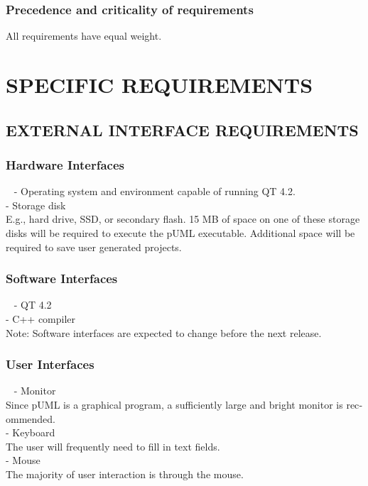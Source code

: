 \documentclass[twoside,letterpaper]{article}
\begin{document}
\subsubsection[Precedence and criticality of requirements]{\rmfamily\bfseries
Precedence and criticality of requirements}
{
All requirements have equal weight.}












\clearpage\section[SPECIFIC REQUIREMENTS]{\rmfamily\bfseries
SPECIFIC REQUIREMENTS}

\subsection[EXTERNAL INTERFACE REQUIREMENTS]{\rmfamily\bfseries
EXTERNAL INTERFACE REQUIREMENTS}

\subsubsection[Hardware Interfaces]{\rmfamily\bfseries
Hardware Interfaces}
{
\foreignlanguage{english}{\ }\foreignlanguage{english}
{
- Operating system and environment capable of running QT 4.2.
\\- Storage disk
\\  E.g., hard drive, SSD, or secondary flash. 15 MB of space on one of these storage disks will be required
to execute the pUML executable. Additional space will be required to save user generated projects.}}

\subsubsection[Software Interfaces]{\rmfamily\bfseries
Software Interfaces}
{ \foreignlanguage{english}{\ }\foreignlanguage{english}
{
- QT 4.2
\\- C++ compiler
\\  Note: Software interfaces are expected to change before the next release.
}}

\subsubsection[User Interfaces]{\rmfamily\bfseries
User Interfaces}
{
\foreignlanguage{english}{\ }\foreignlanguage{english}
{
- Monitor
\\  Since pUML is a graphical program, a sufficiently large and bright monitor is recommended.
\\- Keyboard
\\  The user will frequently need to fill in text fields.
\\- Mouse
\\  The majority of user interaction is through the mouse.}}
\end{document}
